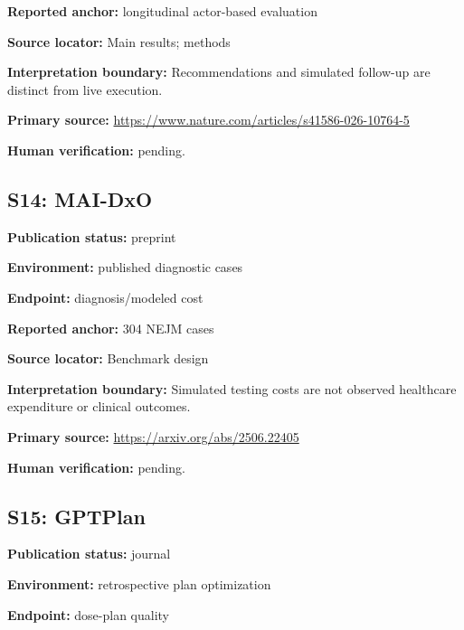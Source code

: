 \documentclass[journal,onecolumn,10pt]{IEEEtran}
\begin{document}
\noindent\textbf{Reported anchor:} longitudinal actor-based evaluation\par

\noindent\textbf{Source locator:} Main results; methods\par

\noindent\textbf{Interpretation boundary:} Recommendations and simulated follow-up are distinct from live execution.\par

\noindent\textbf{Primary source:} \url{https://www.nature.com/articles/s41586-026-10764-5}\par
\noindent\textbf{Human verification:} pending.

\subsection*{S14: MAI-DxO}

\noindent\textbf{Publication status:} preprint\par

\noindent\textbf{Environment:} published diagnostic cases\par

\noindent\textbf{Endpoint:} diagnosis/modeled cost\par

\noindent\textbf{Reported anchor:} 304 NEJM cases\par

\noindent\textbf{Source locator:} Benchmark design\par

\noindent\textbf{Interpretation boundary:} Simulated testing costs are not observed healthcare expenditure or clinical outcomes.\par

\noindent\textbf{Primary source:} \url{https://arxiv.org/abs/2506.22405}\par
\noindent\textbf{Human verification:} pending.

\subsection*{S15: GPTPlan}

\noindent\textbf{Publication status:} journal\par

\noindent\textbf{Environment:} retrospective plan optimization\par

\noindent\textbf{Endpoint:} dose-plan quality\par
\end{document}
